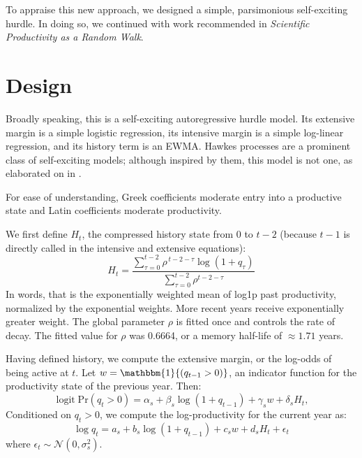 \documentclass[twocolumn, letterpaper]{article}
\begin{document}
To appraise this new approach, we designed a simple, parsimonious self-exciting hurdle. In doing so, we continued with work recommended in \textit{Scientific Productivity as a Random Walk}.

\section{Design}
\label{sec:design}
Broadly speaking, this is a self-exciting autoregressive hurdle model. Its extensive margin is a simple logistic regression, its intensive margin is a simple log-linear regression, and its history term is an EWMA. Hawkes processes are a prominent class of self-exciting models; although inspired by them, this model is not one, as elaborated on in . 

For ease of understanding, Greek coefficients moderate entry into a productive state and Latin coefficients moderate productivity. 

We first define $H_t$, the compressed history state from $0$ to $t-2$ (because $t-1$ is directly called in the intensive and extensive equations):
\begin{equation}
    H_t =\frac{\sum_{\tau=0}^{t-2}\rho^{\,t-2-\tau}\log(1+q_{\tau})}{\sum_{\tau=0}^{t-2}\rho^{t-2-\tau}}
\label{eq:history_state}
\end{equation}
In words, that is the exponentially weighted mean of log1p past productivity, normalized by the exponential weights. More recent years receive exponentially greater weight. The global parameter $\rho$ is fitted once and controls the rate of decay. The fitted value for $\rho$ was 0.6664, or a memory half-life of $\approx 1.71$ years.

Having defined history, we compute the extensive margin, or the log-odds of being active at $t$. Let $w = \mathbbm{1}\{(q_{t-1} >0)\}$, an indicator function for the productivity state of the previous year. Then:
\begin{equation}
    \operatorname{logit}\text{Pr}(q_t > 0) = \alpha_s +\beta_s\log(1+q_{t-1}) +\gamma_sw+\delta_s H_{t},
\label{eq:extensive_margin}
\end{equation}
Conditioned on $q_t >0$, we compute the log-productivity for the current year as:
\begin{equation}
    \log q_t = a_s +b_s\log(1+q_{t-1}) +c_sw +d_sH_{t}+\epsilon_{t}
\label{eq:intensive_margin}
\end{equation}
where $\epsilon_t \sim \mathcal{N}(0, \sigma^2_s)$.
\end{document}
